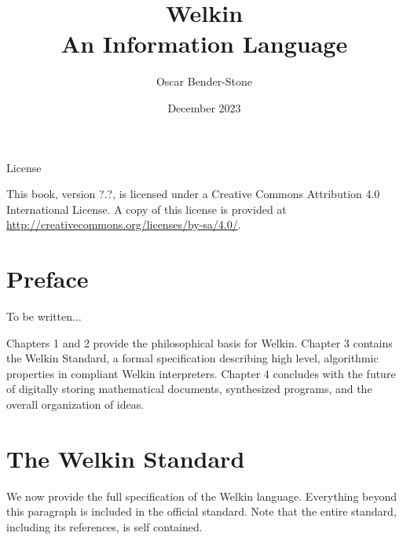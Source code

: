 \documentclass[oneside, leqno]{book}
\title{Welkin \\
  An Information Language}
\author{Oscar Bender-Stone}
\date{December 2023}
\begin{document}
\maketitle


\begin{center}
{\sc License}\

\vspace{2ex}
This book, version ?.?, is licensed under a Creative Commons Attribution 4.0 International License.
A copy of this license is provided at \url{http://creativecommons.org/licenses/by-sa/4.0/}.
\end{center}

\newpage

\chapter*{Preface}

To be written...


Chapters 1 and 2 provide the philosophical basis for Welkin. Chapter 3 contains the Welkin Standard, a formal specification describing high level, algorithmic properties in compliant Welkin interpreters. Chapter 4 concludes with the future of digitally storing mathematical documents, synthesized programs, and the overall organization of ideas.


\mainmatter



\chapter{The Welkin Standard}

We now provide the full specification of the Welkin language. Everything beyond this paragraph is included in the official standard. Note that the entire standard, including its references, is self contained.





\end{document}
